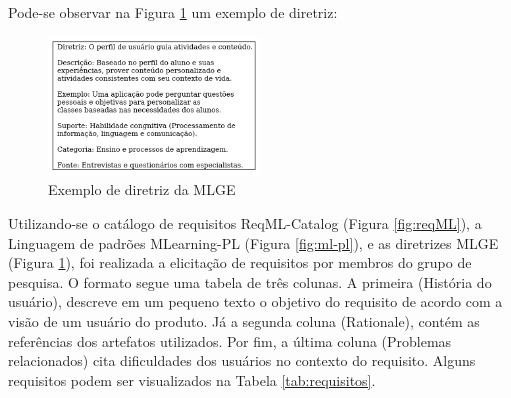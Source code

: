 Pode-se observar na Figura \ref{fig:mlge} um exemplo de diretriz:

\begin{figure}[H]
\centering
    \caption{Exemplo de diretriz da MLGE}
    \label{fig:mlge}
    \includegraphics[width=0.5\textwidth]{Figuras/MLGE-Exemplo.png}
\end{figure}


Utilizando-se o catálogo de requisitos ReqML-Catalog (Figura \ref{fig:reqML}), a Linguagem de padrões MLearning-PL (Figura \ref{fig:ml-pl}), e as diretrizes MLGE (Figura \ref{fig:mlge}), foi realizada a elicitação de requisitos por membros do grupo de pesquisa. O formato segue uma tabela de três colunas. A primeira (História do usuário), descreve em um pequeno texto o objetivo do requisito de acordo com a visão de um usuário do produto. Já a segunda coluna (Rationale), contém as referências dos artefatos utilizados. Por fim, a última coluna (Problemas relacionados) cita dificuldades dos usuários no contexto do requisito. Alguns requisitos podem ser visualizados na Tabela \ref{tab:requisitos}.

